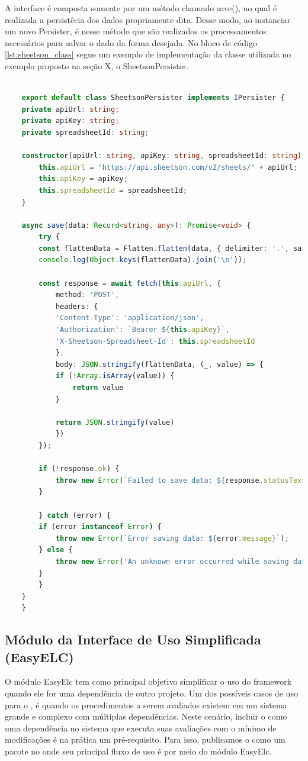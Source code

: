 \documentclass[12pt]{tcc}
\begin{document}
	A interface é composta somente por um método chamado save(), no qual é realizada a persistêcia dos dados propriamente dita. Desse modo, ao instanciar um novo Persister, é nesse método que são realizados os processamentos necessários para salvar o dado da forma desejada. No bloco de código \ref{lst:sheetson_class} segue um exemplo de implementação da classe utilizada no exemplo proposto na seção X, o SheetsonPersister.

	\begin{lstlisting}[label={lst:sheetson_class}, caption={Implementação da classe responsável pela persistência dos dados usando o Sheetson.}, language=TypeScript, breaklines=true]

	export default class SheetsonPersister implements IPersister {
	private apiUrl: string;
	private apiKey: string;
	private spreadsheetId: string;

	constructor(apiUrl: string, apiKey: string, spreadsheetId: string) {
		this.apiUrl = "https://api.sheetson.com/v2/sheets/" + apiUrl;
		this.apiKey = apiKey;
		this.spreadsheetId = spreadsheetId;
	}

	async save(data: Record<string, any>): Promise<void> {
		try {
		const flattenData = Flatten.flatten(data, { delimiter: '.', safe: true });
		console.log(Object.keys(flattenData).join('\n'));
		
		const response = await fetch(this.apiUrl, {
			method: 'POST',
			headers: {
			'Content-Type': 'application/json',
			'Authorization': `Bearer ${this.apiKey}`,
			'X-Sheetson-Spreadsheet-Id': this.spreadsheetId
			},
			body: JSON.stringify(flattenData, (_, value) => {
			if (!Array.isArray(value)) {
				return value
			}

			return JSON.stringify(value)
			})
		});

		if (!response.ok) {
			throw new Error(`Failed to save data: ${response.statusText}`);
		}

		} catch (error) {
		if (error instanceof Error) {
			throw new Error(`Error saving data: ${error.message}`);
		} else {
			throw new Error('An unknown error occurred while saving data.');
		}
		}
	}
	}
	\end{lstlisting}


	\subsection{Módulo da Interface de Uso Simplificada (EasyELC)}
		\label{subsec:implemencao-easyelc}

	O módulo EasyElc tem como principal objetivo simplificar o uso do framework quando ele for uma dependência de outro projeto.
	Um dos possíveis casos de uso para o , é quando os procedimentos a serem avaliados existem em um sistema grande e complexo com múltiplas dependências.
	Neste cenário, incluir o  como uma dependência no sistema que executa suas avaliações com o mínimo de modificações é na prática um pré-requisito.
	Para isso, publicamos o  como um pacote no  onde seu principal fluxo de uso é por meio do módulo EasyElc.
\end{document}
